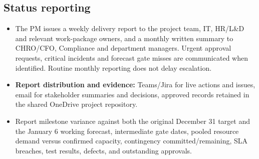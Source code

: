 \subsection{Status reporting}\label{sec:5.2}
\begin{itemize}
\item The PM issues a weekly delivery report to the project team, IT, HR/\allowbreak{}L\&D and relevant work-package owners, and a monthly written summary to CHRO/\allowbreak{}CFO, Compliance and department managers. Urgent approval requests, critical incidents and forecast gate misses are communicated when identified. Routine monthly reporting does not delay escalation.
\item \textbf{Report distribution and evidence:} Teams/\allowbreak{}Jira for live actions and issues, email for stakeholder summaries and decisions, approved records retained in the shared OneDrive project repository.
\item Report milestone variance against both the original December 31 target and the January 6 working forecast, intermediate gate dates, pooled resource demand versus confirmed capacity, contingency committed/\allowbreak{}remaining, SLA breaches, test results, defects, and outstanding approvals.
\end{itemize}


